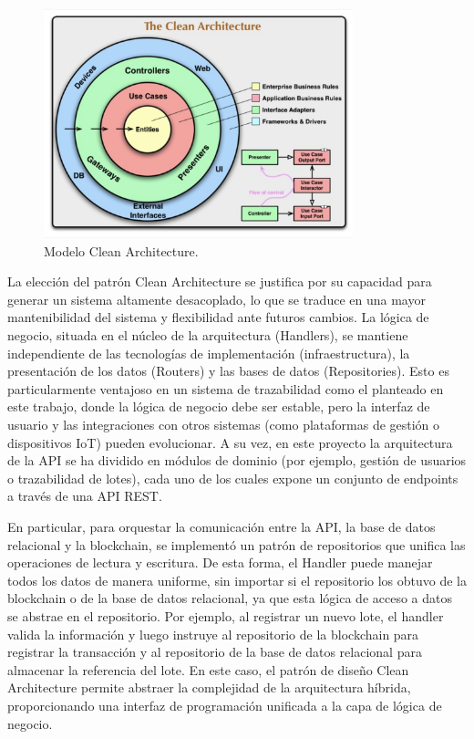 \begin{figure}[!htb]
\centering
\includegraphics[width=0.8\textwidth]{Figures/clean-architecture.png}
\caption{Modelo Clean Architecture.}
\label{fig:clean-architecture}
\end{figure}

La elección del patrón Clean Architecture se justifica por su capacidad para generar un sistema altamente desacoplado, lo que se traduce en una mayor  mantenibilidad del sistema y flexibilidad ante futuros cambios. La lógica de negocio, situada en el núcleo de la arquitectura (Handlers), se mantiene independiente de las tecnologías de implementación (infraestructura), la presentación de los datos (Routers) y las bases de datos (Repositories). Esto es particularmente ventajoso en un sistema de trazabilidad como el planteado en este trabajo, donde la lógica de negocio debe ser estable, pero la interfaz de usuario y las integraciones con otros sistemas (como plataformas de gestión o dispositivos IoT) pueden evolucionar. A su vez, en este proyecto la arquitectura de la API se ha dividido en módulos de dominio (por ejemplo, gestión de usuarios o trazabilidad de lotes), cada uno de los cuales expone un conjunto de endpoints a través de una API REST.

En particular, para orquestar la comunicación entre la API, la base de datos relacional y la blockchain, se implementó un patrón de repositorios que unifica las operaciones de lectura y escritura. De esta forma, el Handler puede manejar todos los datos de manera uniforme, sin importar si el repositorio los obtuvo de la blockchain o de la base de datos relacional, ya que esta lógica de acceso a datos se abstrae en el repositorio. Por ejemplo, al registrar un nuevo lote, el handler valida la información y luego instruye al repositorio de la blockchain para registrar la transacción y al repositorio de la base de datos relacional para almacenar la referencia del lote. En este caso, el patrón de diseño Clean Architecture permite abstraer la complejidad de la arquitectura híbrida, proporcionando una interfaz de programación unificada a la capa de lógica de negocio.

